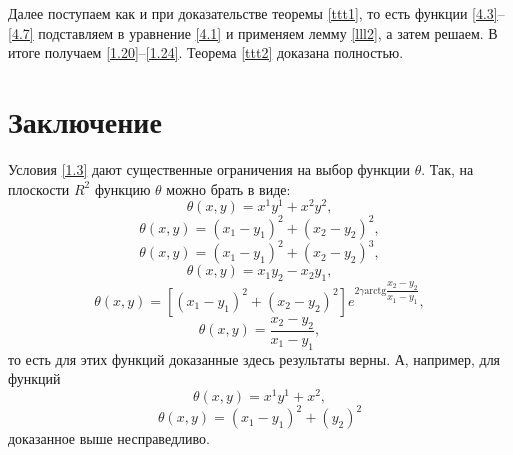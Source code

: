 Далее поступаем как и при доказательстве теоремы \eqref{ttt1}, то есть функции \eqref{4.3}--\eqref{4.7} подставляем в уравнение \eqref{4.1} и применяем лемму \ref{lll2}, а затем решаем. В итоге получаем \eqref{1.20}--\eqref{1.24}. Теорема \ref{ttt2} доказана полностью.



\section*{Заключение}
Условия \eqref{1.3} дают существенные ограничения на выбор функции $\theta$.
Так, на плоскости $R^2$ функцию $\theta$ можно брать в виде:
$$ \theta(x,y) = x^1y^1 + x^2y^2, $$
$$ \theta(x,y) = (x_1-y_1)^2 + (x_2-y_2)^2, $$
$$ \theta(x,y) = (x_1-y_1)^2 + (x_2-y_2)^3, $$
$$ \theta(x,y) = x_1y_2 - x_2y_1, $$
$$ \theta(x,y) = [(x_1-y_1)^2 + (x_2-y_2)^2]e^{2\gamma \text{arctg}\dfrac{x_2-y_2}{x_1-y_1}}, $$
$$ \theta(x,y) = \dfrac{x_2-y_2}{x_1-y_1}, $$
то есть для этих функций доказанные здесь результаты верны. А, например, для функций
$$ \theta(x,y) = x^1y^1 + x^2, $$
$$ \theta(x,y) = (x_1-y_1)^2 + (y_2)^2 $$
доказанное выше несправедливо.


